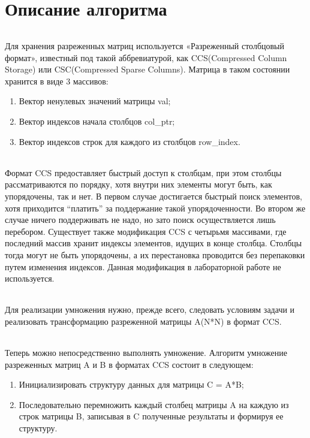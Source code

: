 \documentclass[12pt,a4paper]{article}
\begin{document}
\part*{Описание алгоритма}
\paragraph{}Для хранения разреженных матриц используется «Разреженный столбцовый формат», известный под такой аббревиатурой, как CCS(Compressed Column Storage) или CSC(Compressed Sparse Columns). Матрица в таком состоянии хранится в виде 3 массивов:
\begin{enumerate} 
\item Вектор ненулевых значений матрицы val;
\item Вектор индексов начала столбцов col\_ptr;
\item Вектор индексов строк для каждого из столбцов row\_index.
\end{enumerate} 
\paragraph{}Формат CCS предоставляет быстрый доступ к столбцам, при этом столбцы рассматриваются по порядку, хотя внутри них элементы могут быть, как упорядочены, так и нет. В первом случае достигается быстрый поиск элементов, хотя приходится “платить” за поддержание такой упорядоченности. Во втором же случае ничего поддерживать не надо, но зато поиск осуществляется лишь перебором. Существует также модификация CCS с четырьмя массивами, где последний массив хранит индексы элементов, идущих в конце столбца. Столбцы тогда могут не быть упорядочены, а их перестановка проводится без перепаковки путем изменения индексов. Данная модификация в лабораторной работе не используется.
\paragraph{}Для реализации умножения нужно, прежде всего, следовать условиям задачи и реализовать трансформацию разреженной матрицы A(N*N) в формат CCS. 
\paragraph{}Теперь можно непосредственно выполнять умножение. Алгоритм умножение разреженных матриц A и B в форматах CCS состоит в следующем:
\begin{enumerate} 
\item Инициализировать структуру данных для матрицы C = A*B;
\item Последовательно перемножить каждый столбец матрицы A на каждую из строк матрицы B, записывая в C полученные результаты и формируя ее структуру.
\end{enumerate} 
\end{document}
